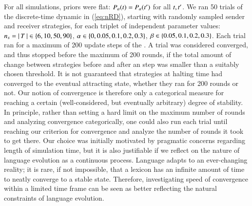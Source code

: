 \documentclass[fleqn,reqno,10pt]{article}
\newcommand{\rdd}{\acro{rdd}} %
\newcommand{\imprecision}{\ensuremath{\alpha}} %
\newcommand{\toler}{\ensuremath{\beta}} %
\newcommand{\ns}{\ensuremath{n_s}} %
\begin{document}
For all simulations, priors were flat: $P_a(t) = P_a(t')$ for all
$t, t'$. We ran 50 trials of the discrete-time dynamic in (\ref{eq:nRD}), starting
with randomly sampled sender and receiver strategies, for each triplet of independent parameter
values: $\ns = \card{T} \in \set{6, 10, 50, 90}$,
$\imprecision \in \set{0, 0.05, 0.1, 0.2, 0.3}$, $\toler \in \set{0.05, 0.1, 0.2, 0.3}$. Each
trial ran for a maximum of 200 update steps of the \rdd. A trial was considered converged, and
thus stopped before the maximum of 200 rounds, if the total amount of change between strategies
before and after an \rdd step was smaller than a suitably chosen threshold. It is not
guaranteed that strategies at halting time had converged to the eventual attracting state,
whether they ran for 200 rounds or not. Our notion of convergence is therefore only a
categorical measure for reaching a certain (well-considered, but eventually arbitrary) degree
of stability. In principle, rather than setting a hard limit on the maximum number of rounds
and analyzing convergence categorically, one could also run each trial until reaching our
criterion for convergence and analyze the number of rounds it took to get there.  Our choice
was initially motivated by pragmatic concerns regarding length of simulation time, but it is
also justifiable if we reflect on the nature of language evolution as a continuous process.
Language adapts to an ever-changing reality; it is rare, if not impossible, that a lexicon has
an infinite amount of time to neatly converge to a stable state. Therefore, investigating speed
of convergence within a limited time frame can be seen as better reflecting the natural
constraints of language evolution.
\end{document}
